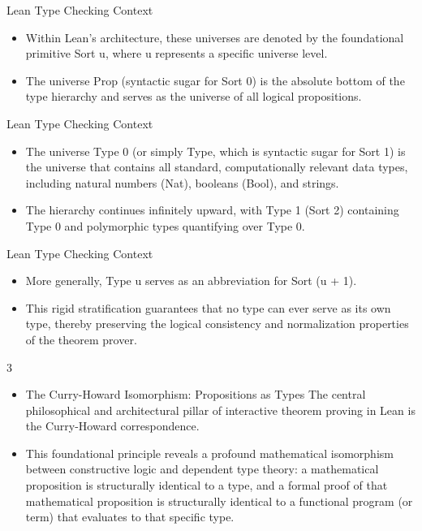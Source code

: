 \documentclass[10pt]{beamer}
\begin{document}
\begin{frame}{Lean Type Checking Context}
\begin{itemize}\setlength{\itemsep}{1.5em}
  \item Within Lean's architecture, these universes are denoted by the foundational primitive Sort u, where u represents a specific universe level.
  \item The universe Prop (syntactic sugar for Sort 0) is the absolute bottom of the type hierarchy and serves as the universe of all logical propositions.
\end{itemize}
\end{frame}

\begin{frame}{Lean Type Checking Context}
\begin{itemize}\setlength{\itemsep}{1.5em}
  \item The universe Type 0 (or simply Type, which is syntactic sugar for Sort 1) is the universe that contains all standard, computationally relevant data types, including natural numbers (Nat), booleans (Bool), and strings.
  \item The hierarchy continues infinitely upward, with Type 1 (Sort 2) containing Type 0 and polymorphic types quantifying over Type 0.
\end{itemize}
\end{frame}

\begin{frame}{Lean Type Checking Context}
\begin{itemize}\setlength{\itemsep}{1.5em}
  \item More generally, Type u serves as an abbreviation for Sort (u + 1).
  \item This rigid stratification guarantees that no type can ever serve as its own type, thereby preserving the logical consistency and normalization properties of the theorem prover.
\end{itemize}
\end{frame}

\begin{frame}{3}
\begin{itemize}\setlength{\itemsep}{1.5em}
  \item The Curry-Howard Isomorphism: Propositions as Types The central philosophical and architectural pillar of interactive theorem proving in Lean is the Curry-Howard correspondence.
  \item This foundational principle reveals a profound mathematical isomorphism between constructive logic and dependent type theory: a mathematical proposition is structurally identical to a type, and a formal proof of that mathematical proposition is structurally identical to a functional program (or term) that evaluates to that specific type.
\end{itemize}
\end{frame}
\end{document}
